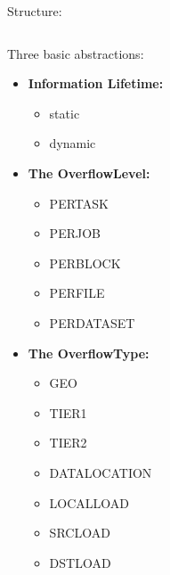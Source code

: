 \documentclass[8pt,mathserif,a4paper,oneside,pdf]{beamer}
\begin{document}
\begin{frame}[fragile]{Structure:}
  \begin{columns}
    \begin{column}[T]{5cm}
      Three basic abstractions:
      \begin{itemize}
      \item
        \textbf{Information Lifetime:}
        \begin{itemize}
        \item
          static
        \item
          dynamic
        \end{itemize}
      \item
        \textbf{The OverflowLevel:}
        \begin{itemize}
        \item
          PERTASK
        \item
          PERJOB
        \item
          PERBLOCK
        \item
          PERFILE
        \item
          PERDATASET
        \end{itemize}
      \item
        \textbf{The OverflowType:}
        \begin{itemize}
        \item
          GEO
        \item
          TIER1
        \item
          TIER2
        \item
          DATALOCATION
        \item
          LOCALLOAD
        \item
          SRCLOAD
        \item
          DSTLOAD
        \end{itemize}
      \end{itemize}
    \end{column}
    \begin{column}[T]{7cm}
      {}
    \end{column}
  \end{columns}
\end{frame}
\end{document}
